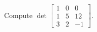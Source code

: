 \begin{applicationActivities}
%
%
%
%


\begin{activity}{5}
  Compute  $\det \begin{bmatrix} 1 & 0 & 0 \\ 1 & 5 & 12 \\ 3 & 2 & -1 \end{bmatrix}$.
\end{activity}


\end{applicationActivities}
